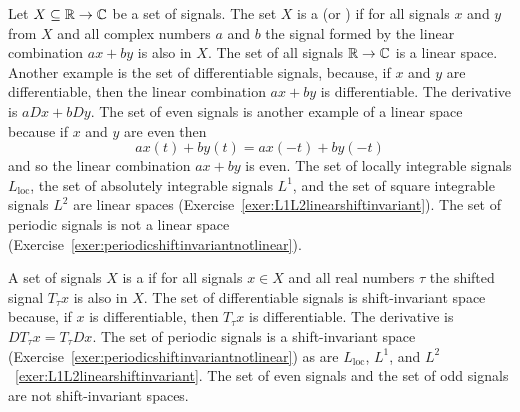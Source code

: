 Let $X \subseteq {\mathbb R} \to {\mathbb C}$ be a set of signals.  The set $X$ is a  (or ) if for all signals $x$ and $y$ from $X$ and all complex numbers $a$ and $b$ the signal formed by the linear combination $ax + by$ is also in $X$.  The set of all signals ${\mathbb R} \to {\mathbb C}$ is a linear space.  Another example is the set of differentiable signals, because, if $x$ and $y$ are differentiable, then the linear combination $ax + by$ is differentiable.  The derivative is $a D x + b D y$.  The set of even signals is another example of a linear space because if $x$ and $y$ are even then
\[
ax(t) + by(t) = a x(-t) + b y(-t)
\]
and so the linear combination $ax + by$ is even.  The set of locally integrable signals $L_{\text{loc}}$, the set of absolutely integrable signals $L^1$, and the set of square integrable signals $L^2$ are linear spaces (Exercise~\ref{exer:L1L2linearshiftinvariant}).  The set of periodic signals is not a linear space (Exercise~\ref{exer:periodicshiftinvariantnotlinear}).

A set of signals $X$ is a  if for all signals $x \in X$ and all real numbers $\tau$ the shifted signal $T_\tau x$ is also in $X$.  The set of differentiable signals is shift-invariant space because, if $x$ is differentiable, then $T_\tau x$ is differentiable.  The derivative is $D T_\tau x = T_\tau D x$.  The set of periodic signals is a shift-invariant space (Exercise~\ref{exer:periodicshiftinvariantnotlinear}) as are $L_{\text{loc}}$, $L^1$, and $L^2$~\eqref{exer:L1L2linearshiftinvariant}.  The set of even signals and the set of odd signals are not shift-invariant spaces.


